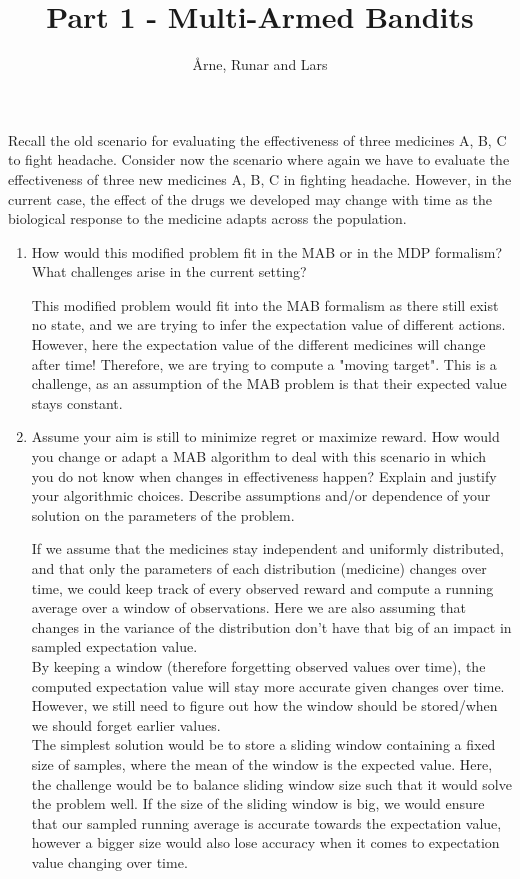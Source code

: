 \documentclass{article}
\title{\vspace{-5.0cm}Part 1 - Multi-Armed Bandits\vspace{-0.3cm}}
\author{Årne, Runar and Lars\vspace{-0.5cm}}
\begin{document}
\maketitle
\vspace{-0.5cm}

Recall the old scenario for evaluating the effectiveness of three medicines A, B, C to fight headache. Consider now the scenario where again we have to evaluate the effectiveness of three new medicines A, B, C in fighting headache. However, in the current case, the effect of the drugs we developed may change with time as the biological response to the medicine adapts across the population.
\begin{enumerate}

\item{How would this modified problem fit in the MAB or in the MDP formalism? What challenges arise in the current setting?}

This modified problem would fit into the MAB formalism as there still exist no state, and we are trying to infer the expectation value of different actions. However, here the expectation value of the different medicines will change after time! Therefore, we are trying to compute a "moving target". This is a challenge, as an assumption of the MAB problem is that their expected value stays constant.

\item{Assume your aim is still to minimize regret or maximize reward. How would you change or adapt a MAB algorithm to deal with this scenario in which you do not know when changes in effectiveness happen? Explain and justify your algorithmic choices. Describe assumptions and/or dependence of your solution on the parameters of the problem.}

If we assume that the medicines stay independent and uniformly distributed, and that only the parameters of each distribution (medicine) changes over time, we could keep track of every observed reward and compute a running average over a window of observations. Here we are also assuming that changes in the variance of the distribution don't have that big of an impact in sampled expectation value.
\\[5pt]
By keeping a window (therefore forgetting observed values over time), the computed expectation value will stay more accurate given changes over time.  However, we still need to figure out how the window should be stored/when we should forget earlier values.
\\[5pt]
The simplest solution would be to store a sliding window containing a fixed size of samples, where the mean of the window is the expected value. Here, the challenge would be to balance sliding window size such that it would solve the problem well. If the size of the sliding window is big, we would ensure that our sampled running average is accurate towards the expectation value, however a bigger size would also lose accuracy when it comes to expectation value changing over time.


\end{enumerate}
\end{document}
